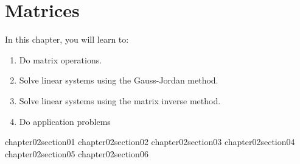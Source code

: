 \chapter{Matrices}

In this chapter, you will learn to:

\begin{enumerate}
    \item Do matrix operations.
    \item Solve linear systems using the Gauss-Jordan method.
    \item Solve linear systems using the matrix inverse method.
    \item Do application problems
\end{enumerate}


{chapter02section01}
{chapter02section02}
{chapter02section03}
{chapter02section04}
{chapter02section05}
{chapter02section06}